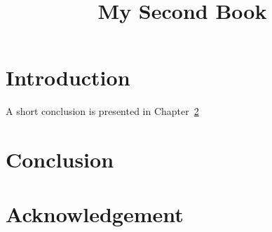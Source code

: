 \documentclass[12pt,a4paper]{book}
\title{My Second Book}
\begin{document}
	\frontmatter
		\maketitle
		\tableofcontents
	\mainmatter
		\chapter{Introduction}
			A short conclusion is presented in Chapter~\ref{TheEnd}
		\chapter{Conclusion}
		\label{TheEnd}
	\backmatter
		\chapter*{Acknowledgement}
		
\end{document}
